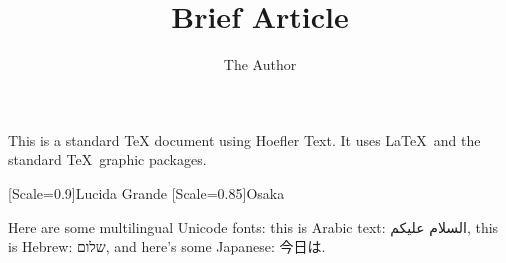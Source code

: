 \documentclass[12pt]{article}
\title{Brief Article}
\author{The Author}
\begin{document}
\maketitle

This is a standard TeX document using Hoefler Text. It uses \LaTeX\ and
the standard \TeX\ graphic packages.


\newfontfamily{\HEB}[Scale=0.9]{Lucida Grande}
\newfontfamily{\J}[Scale=0.85]{Osaka}

Here are some multilingual Unicode fonts: this is Arabic text: {\A السلام عليكم}, 
this is Hebrew: {\HEB שלום}, and here's some Japanese: {\J 今日は}.
\end{document}
